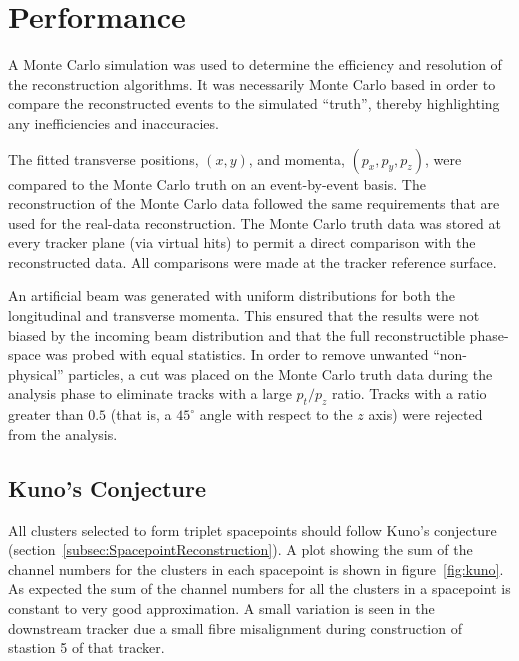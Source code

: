 \section{Performance}
\label{sec:Performance}

  A Monte Carlo simulation was used to determine the efficiency and resolution of the reconstruction algorithms. It was necessarily Monte Carlo based in order to compare the reconstructed events to the simulated ``truth'', thereby highlighting any inefficiencies and inaccuracies.

  The fitted transverse positions, $(x,y)$, and momenta, $(p_x, p_y, p_z)$, were compared to the Monte Carlo truth on an event-by-event basis. The reconstruction of the Monte Carlo data followed the same requirements that are used for the real-data reconstruction. The Monte Carlo truth data was stored at every tracker plane (via virtual hits) to permit a direct comparison with the reconstructed data. All comparisons were made at the tracker reference surface. %

  An artificial beam was generated with uniform distributions for both the longitudinal and transverse momenta. This ensured that the results were not biased by the incoming beam distribution and that the full reconstructible phase-space was probed with equal statistics. In order to remove unwanted ``non-physical'' particles, a cut was placed on the Monte Carlo truth data during the analysis phase to eliminate tracks with a large $p_t/p_z$ ratio. Tracks with a ratio greater than $0.5$ (that is, a $45^\circ$ angle with respect to the $z$ axis) were rejected from the analysis.
  
  \subsection{Kuno's Conjecture}
  \label{sec:performance:kunos_conjecture}
  
  All clusters selected to form triplet spacepoints should follow Kuno's conjecture (section~\ref{subsec:SpacepointReconstruction}). A plot showing the sum of the channel numbers for the clusters in each spacepoint is shown in figure~\ref{fig:kuno}. As expected the sum of the channel numbers for all the clusters in a spacepoint is constant to very good approximation. A small variation is seen in the downstream tracker due a small fibre misalignment during construction of stastion 5 of that tracker.  %

